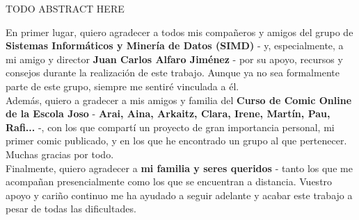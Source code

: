 TODO ABSTRACT HERE

\cleardoublepage
\thispagestyle{plain}
\begin{center}
\Large{}
\end{center}
\vskip1cm

En primer lugar, quiero agradecer a todos mis compañeros y amigos del grupo de \textbf{Sistemas Informáticos y Minería de Datos (SIMD)} - y, especialmente, a mi amigo y director \textbf{Juan Carlos Alfaro Jiménez} - por su apoyo, recursos y consejos durante la realización de este trabajo. Aunque ya no sea formalmente parte de este grupo, siempre me sentiré vinculada a él.\\

Además, quiero a gradecer a mis amigos y familia del \textbf{Curso de Comic Online de la Escola Joso} - \textbf{Arai, Aina, Arkaitz, Clara, Irene, Martín, Pau, Rafi...} -, con los que compartí un proyecto de gran importancia personal, mi primer comic publicado, y en los que he encontrado un grupo al que pertenecer. Muchas gracias por todo.\\

Finalmente, quiero agradecer a \textbf{mi familia y seres queridos} - tanto los que me acompañan presencialmente como los que se encuentran a distancia. Vuestro apoyo y cariño continuo me ha ayudado a seguir adelante y acabar este trabajo a pesar de todas las dificultades.